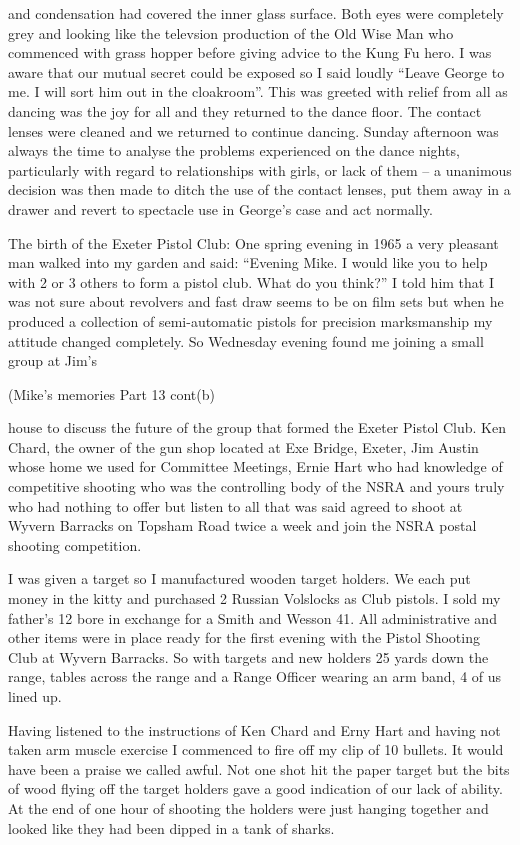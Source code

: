 and condensation had covered the inner glass surface.  Both eyes were
completely grey and looking like the televsion production of the Old Wise Man
who commenced with                 grass hopper before giving advice to the
Kung Fu hero.  I was aware that our mutual secret could be exposed so I said
loudly ``Leave George to me.  I will sort him out in the cloakroom''.  This was
greeted with relief from all as dancing was the joy for all and they returned
to the dance floor. The contact lenses were cleaned and we returned to continue
dancing. Sunday afternoon was always the time to analyse the problems
experienced on the dance nights, particularly with regard to relationships with
girls, or lack of them – a unanimous decision was then made to ditch the use of
the contact lenses, put them away in a drawer and revert to spectacle use in
George's case and act normally.

The birth of the Exeter Pistol Club:  One spring evening in 1965 a very pleasant
man walked into my garden and said: ``Evening Mike.  I would like you to help
with 2 or 3 others to form a pistol club.  What do you think?''  I told him
that I was not sure about revolvers and fast draw seems to be on film sets but
when he produced a collection of semi-automatic pistols for precision
marksmanship  my attitude changed completely.  So Wednesday evening found me
joining a small group at Jim's

(Mike's memories Part 13 cont(b)

house to discuss the future of the group that formed the Exeter Pistol Club. Ken
Chard, the owner of the gun shop located at Exe Bridge, Exeter, Jim Austin
whose home we used for Committee Meetings, Ernie Hart who had knowledge of
competitive shooting who was the controlling body of the NSRA and yours truly
who had nothing to offer but listen to all that was said agreed to shoot at
Wyvern Barracks on Topsham Road twice a week and join the NSRA postal shooting
competition.

I was given a target so I manufactured wooden target holders.  We each put money
in the kitty and purchased 2 Russian Volslocks as Club pistols.  I sold my
father's 12 bore in exchange for a Smith and Wesson 41.  All administrative and
other items were in place ready for the first evening with the Pistol Shooting
Club at Wyvern Barracks.  So with targets and new holders 25 yards down the
range, tables across the range and a Range Officer wearing an arm band, 4 of us
lined up.

Having listened to the instructions of Ken Chard and Erny Hart and having not
taken arm muscle exercise I commenced to fire off my clip of 10 bullets.  It
would have been a praise we called awful.  Not one shot hit the paper target
but the bits of wood flying off the target holders gave a good indication of
our lack of ability.  At the end of one hour of shooting the holders were just
hanging together and looked like they had been dipped in a tank of sharks.

